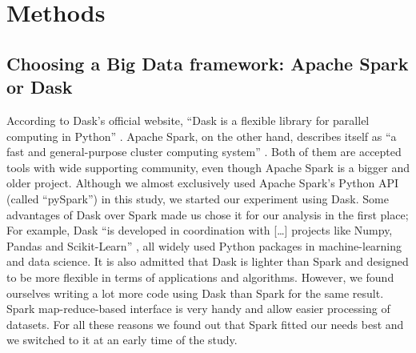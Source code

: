 \documentclass[conference]{IEEEtran}
\begin{document}
\section{Methods}
\subsection{Choosing a Big Data framework: Apache Spark or Dask}
According to Dask’s official website, “Dask is a flexible library for parallel computing in Python” \cite{dask}. Apache Spark, on the other hand, describes itself as “a fast and general-purpose cluster computing system” \cite{spark}. Both of them are accepted tools with wide supporting community, even though Apache Spark is a bigger and older project. Although we almost exclusively used Apache Spark’s Python API (called “pySpark”) in this study, we started our experiment using Dask. Some advantages of Dask over Spark made us chose it for our analysis in the first place; For example, Dask “is developed in coordination with […] projects like Numpy, Pandas and Scikit-Learn” \cite{dask}, all widely used Python packages in machine-learning and data science. It is also admitted that Dask is lighter than Spark and designed to be more flexible in terms of applications and algorithms. However, we found ourselves writing a lot more code using Dask than Spark for the same result. Spark map-reduce-based interface is very handy and allow easier processing of datasets. For all these reasons we found out that Spark fitted our needs best and we switched to it at an early time of the study.
\end{document}
